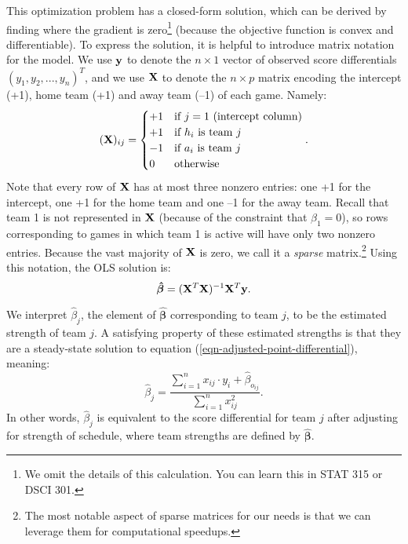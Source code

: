 \documentclass{article}
\begin{document}
  This optimization problem has a closed-form solution, which can be derived by finding where the gradient is zero\footnote{We omit the details of this calculation. You can learn this in STAT 315 or DSCI 301.} (because the objective function is convex and differentiable). To express the solution, it is helpful to introduce matrix notation for the model. We use $\bf y$ to denote the $n \times 1$ vector of observed score differentials $(y_1, y_2, ..., y_n)^T$, and we use $\bf X$ to denote the $n \times p$ matrix encoding the intercept (+1), home team (+1) and away team (--1) of each game. Namely:
  \begin{equation*}
    ({\bf X})_{ij} = \begin{cases}
      +1 & \mbox{if $j = 1$ (intercept column)}\\
      +1 & \mbox{if $h_i$ is team $j$}\\
      -1 & \mbox{if $a_i$ is team $j$}\\
      0 & \mbox{otherwise}
    \end{cases}.
  \end{equation*}
  Note that every row of $\bf X$ has at most three nonzero entries: one +1 for the intercept, one +1 for the home team and one --1 for the away team. Recall that team 1 is not represented in $\bf X$ (because of the constraint that $\beta_1 = 0$), so rows corresponding to games in which team 1 is active will have only two nonzero entries. Because the vast majority of $\bf X$ is zero, we call it a {\it sparse} matrix.\footnote{The most notable aspect of sparse matrices for our needs is that we can leverage them for computational speedups.} Using this notation, the OLS solution is:
  \begin{equation*}
    \boldsymbol{\hat\beta} = ({\bf X}^T {\bf X})^{-1} {\bf X}^T {\bf y}.
  \end{equation*}

  We interpret $\hat\beta_j$, the element of $\boldsymbol{\hat\beta}$ corresponding to team $j$, to be the estimated strength of team $j$. A satisfying property of these estimated strengths is that they are a steady-state solution to equation (\ref{eqn-adjusted-point-differential}), meaning:
  \begin{equation}
    \label{eqn-satisfying-property}
    \hat\beta_j = \frac{
      \sum_{i=1}^n x_{ij} \cdot y_i + \hat\beta_{o_{ij}}
    }{
      \sum_{i=1}^n x_{ij}^2
    }.
  \end{equation}
  In other words, $\hat\beta_j$ is equivalent to the score differential for team $j$ after adjusting for strength of schedule, where team strengths are defined by $\boldsymbol{\hat\beta}$.
\end{document}
